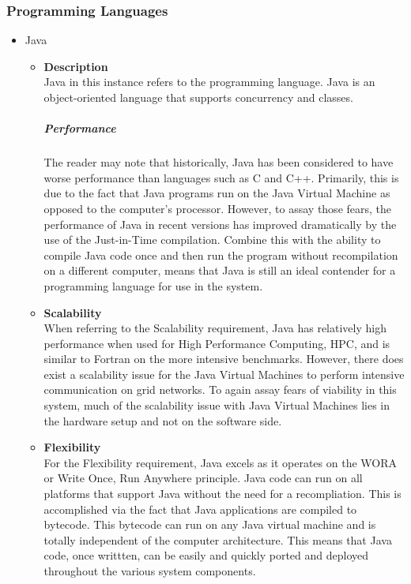 \documentclass[a4paper,10pt]{article}
\begin{document}
\subsubsection{Programming Languages}
	\begin{itemize}
		\item Java
			\begin{itemize}
				\item \textbf{Description}\\
				Java in this instance refers to the programming language. Java is an object-oriented language that supports concurrency and classes. 		\subparagraph{Performance}
				The reader may note that historically, Java has been considered to have worse performance than languages such as C and C++. Primarily, this is due to the fact that Java programs run on the Java Virtual Machine as opposed to the computer's processor. However, to assay those fears, the performance of Java in recent versions has improved dramatically by the use of the Just-in-Time compilation. Combine this with the ability to compile Java code once and then run the program without recompilation on a different computer, means that Java is still an ideal contender for a programming language for use in the system.
				
				\item \textbf{Scalability}\\
				When referring to the Scalability requirement, Java has relatively high performance when used for High Performance Computing, HPC, and is similar to Fortran on the more intensive benchmarks. However, there does exist a scalability issue for the Java Virtual Machines to perform intensive communication on grid networks. To again assay fears of viability in this system, much of the scalability issue with Java Virtual Machines lies in the hardware setup and not on the software side.		
					
				\item \textbf{Flexibility}\\
				For the Flexibility requirement, Java excels as it operates on the WORA or Write Once, Run Anywhere principle. Java code can run on all platforms that support Java without the need for a recompliation. This is accomplished via the fact that Java applications are compiled to bytecode. This bytecode can run on any Java virtual machine and is totally independent of the computer architecture. This means that Java code, once writtten, can be easily and quickly ported and deployed throughout the various system components.
				

\end{itemize}
\end{itemize}
\end{document}
